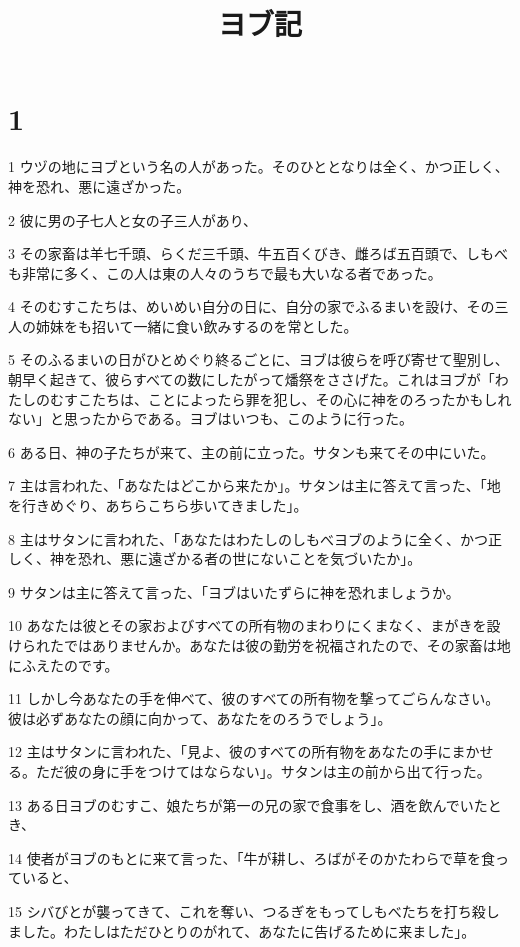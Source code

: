 

\title{ヨブ記}


\chapter{1}

\par 1 ウヅの地にヨブという名の人があった。そのひととなりは全く、かつ正しく、神を恐れ、悪に遠ざかった。
\par 2 彼に男の子七人と女の子三人があり、
\par 3 その家畜は羊七千頭、らくだ三千頭、牛五百くびき、雌ろば五百頭で、しもべも非常に多く、この人は東の人々のうちで最も大いなる者であった。
\par 4 そのむすこたちは、めいめい自分の日に、自分の家でふるまいを設け、その三人の姉妹をも招いて一緒に食い飲みするのを常とした。
\par 5 そのふるまいの日がひとめぐり終るごとに、ヨブは彼らを呼び寄せて聖別し、朝早く起きて、彼らすべての数にしたがって燔祭をささげた。これはヨブが「わたしのむすこたちは、ことによったら罪を犯し、その心に神をのろったかもしれない」と思ったからである。ヨブはいつも、このように行った。
\par 6 ある日、神の子たちが来て、主の前に立った。サタンも来てその中にいた。
\par 7 主は言われた、「あなたはどこから来たか」。サタンは主に答えて言った、「地を行きめぐり、あちらこちら歩いてきました」。
\par 8 主はサタンに言われた、「あなたはわたしのしもべヨブのように全く、かつ正しく、神を恐れ、悪に遠ざかる者の世にないことを気づいたか」。
\par 9 サタンは主に答えて言った、「ヨブはいたずらに神を恐れましょうか。
\par 10 あなたは彼とその家およびすべての所有物のまわりにくまなく、まがきを設けられたではありませんか。あなたは彼の勤労を祝福されたので、その家畜は地にふえたのです。
\par 11 しかし今あなたの手を伸べて、彼のすべての所有物を撃ってごらんなさい。彼は必ずあなたの顔に向かって、あなたをのろうでしょう」。
\par 12 主はサタンに言われた、「見よ、彼のすべての所有物をあなたの手にまかせる。ただ彼の身に手をつけてはならない」。サタンは主の前から出て行った。
\par 13 ある日ヨブのむすこ、娘たちが第一の兄の家で食事をし、酒を飲んでいたとき、
\par 14 使者がヨブのもとに来て言った、「牛が耕し、ろばがそのかたわらで草を食っていると、
\par 15 シバびとが襲ってきて、これを奪い、つるぎをもってしもべたちを打ち殺しました。わたしはただひとりのがれて、あなたに告げるために来ました」。
